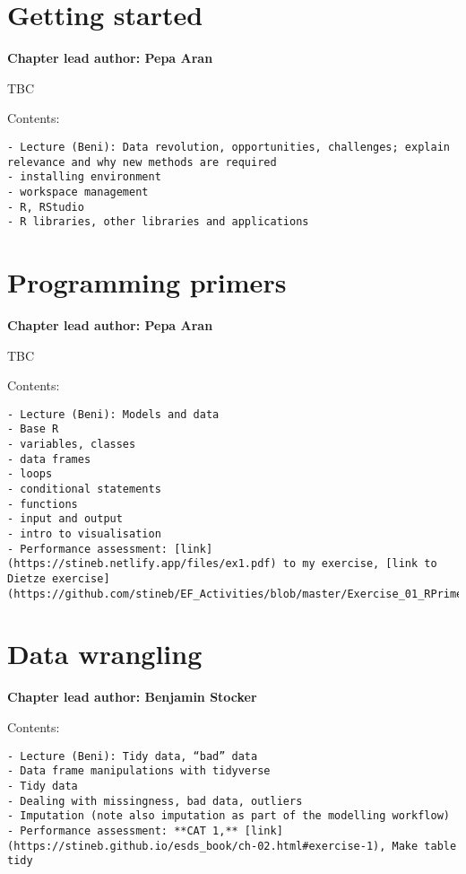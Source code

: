 \documentclass[
]{book}
\begin{document}
\hypertarget{getting_started}{%
\chapter{Getting started}\label{getting_started}}

\textbf{Chapter lead author: Pepa Aran}

TBC

Contents:

\begin{verbatim}
- Lecture (Beni): Data revolution, opportunities, challenges; explain relevance and why new methods are required
- installing environment
- workspace management
- R, RStudio
- R libraries, other libraries and applications
\end{verbatim}

\hypertarget{programming_primers}{%
\chapter{Programming primers}\label{programming_primers}}

\textbf{Chapter lead author: Pepa Aran}

TBC

Contents:

\begin{verbatim}
- Lecture (Beni): Models and data
- Base R
- variables, classes
- data frames
- loops
- conditional statements
- functions
- input and output
- intro to visualisation
- Performance assessment: [link](https://stineb.netlify.app/files/ex1.pdf) to my exercise, [link to Dietze exercise](https://github.com/stineb/EF_Activities/blob/master/Exercise_01_RPrimer.Rmd)
\end{verbatim}

\hypertarget{data_wrangling}{%
\chapter{Data wrangling}\label{data_wrangling}}

\textbf{Chapter lead author: Benjamin Stocker}

Contents:

\begin{verbatim}
- Lecture (Beni): Tidy data, “bad” data
- Data frame manipulations with tidyverse
- Tidy data
- Dealing with missingness, bad data, outliers
- Imputation (note also imputation as part of the modelling workflow)
- Performance assessment: **CAT 1,** [link](https://stineb.github.io/esds_book/ch-02.html#exercise-1), Make table tidy
\end{verbatim}
\end{document}
